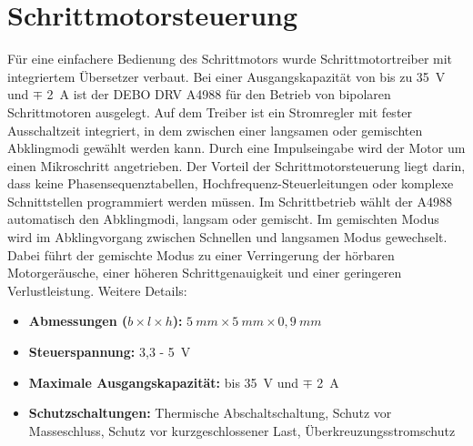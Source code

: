 \section{Schrittmotorsteuerung}	
Für eine einfachere Bedienung des Schrittmotors wurde Schrittmotortreiber mit integriertem Übersetzer verbaut. Bei einer Ausgangskapazität von bis zu 35\ V und $\mp$ 2\ A ist der DEBO DRV A4988 für den Betrieb von bipolaren Schrittmotoren ausgelegt. Auf dem Treiber ist ein Stromregler mit fester Ausschaltzeit integriert, in dem zwischen einer langsamen oder gemischten Abklingmodi gewählt werden kann. Durch eine Impulseingabe wird der Motor um einen Mikroschritt angetrieben. Der Vorteil der Schrittmotorsteuerung liegt darin, dass keine Phasensequenztabellen, Hochfrequenz-Steuerleitungen oder komplexe Schnittstellen programmiert werden müssen. Im Schrittbetrieb wählt der A4988 automatisch den Abklingmodi, langsam oder gemischt. Im gemischten Modus wird im Abklingvorgang zwischen Schnellen und langsamen Modus gewechselt. Dabei führt der gemischte Modus zu einer Verringerung der hörbaren Motorgeräusche, einer höheren Schrittgenauigkeit und einer geringeren Verlustleistung.  
Weitere Details: \begin{itemize}
	\item \textbf{Abmessungen ($b \times l \times h$):} $5 \ mm \times 5 \ mm \times 0,9 \ mm$
	\item \textbf{Steuerspannung:} 3,3 - 5\ V
	\item \textbf{Maximale Ausgangskapazität:} bis 35\ V und $\mp$ 2\ A
	\item \textbf{Schutzschaltungen:}  Thermische Abschaltschaltung, Schutz vor Masseschluss, Schutz vor kurzgeschlossener Last, Überkreuzungsstromschutz
\end{itemize}




